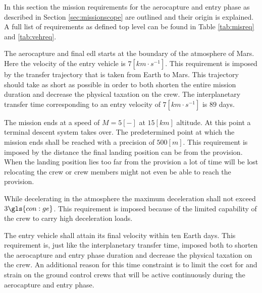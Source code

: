 In this section the mission requirements for the aerocapture and entry phase as described in Section \ref{sec:missionscope} are outlined and their origin is explained. A full list of requirements as defined top level can be found in Table \ref{tab:misreq} and \ref{tab:vehreq}.

The aerocapture and final \gls{edl} starts at the boundary of the atmosphere of Mars. Here the velocity of the entry vehicle is $7 \left[km \cdot s^{-1} \right]$. This requirement is imposed by the transfer trajectory that is taken from Earth to Mars. This trajectory should take as short as possible in order to both shorten the entire mission duration and decrease the physical taxation on the crew. The interplanetary transfer time corresponding to an entry velocity of $7 \left[km \cdot s^{-1} \right]$ is $89$ days. 

The mission ends at a speed of $M=5 \left[-\right]$ at $15 \left[km\right]$ altitude. At this point a terminal descent system takes over. The predetermined point at which the mission ends shall be reached with a precision of $500 \left[m\right]$. This requirement is imposed by the distance the final landing position can be from the provision. When the landing position lies too far from the provision a lot of time will be lost relocating the crew or crew members might not even be able to reach the provision.

While decelerating in the atmosphere the maximum deceleration shall not exceed $3\gls{con:ge}$. This requirement is imposed because of the limited capability of the crew to carry high deceleration loads.

The entry vehicle shall attain its final velocity within ten Earth days. This requirement is, just like the interplanetary transfer time, imposed both to shorten the aerocapture and entry phase duration and decrease the physical taxation on the crew. An additional reason for this time constraint is to limit the cost for and strain on the ground control crews that will be active continuously during the aerocapture and entry phase.


